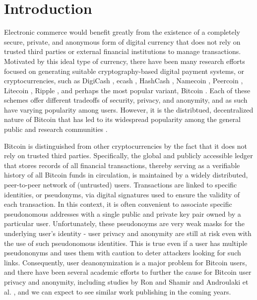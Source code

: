 \section{Introduction}

Electronic commerce would benefit greatly from the existence of a completely secure, private, and anonymous form of digital currency that does not rely on trusted third parties or external financial institutions to manage transactions. Motivated by this ideal type of currency, there have been many research efforts focused on generating suitable cryptography-based digital payment systems, or cryptocurrencies, such as DigiCash \cite{digicash}, ecash \cite{ecash}, HashCash \cite{hashcash}, Namecoin \cite{namecoin}, Peercoin \cite{peercoin}, Litecoin \cite{litecoin}, Ripple \cite{ripple}, and perhaps the most popular variant, Bitcoin \cite{bitcoin}. Each of these schemes offer different tradeoffs of security, privacy, and anonymity, and as such have varying popularity among users. However, it is the distribtued, decentralized nature of Bitcoin that has led to its widespread popularity among the general public and research communities \cite{news articles}. 

Bitcoin is distinguished from other cryptocurrencies by the fact that it does not rely on trusted third parties. Specifically, the global and publicly accessible ledger that stores records of all financial transactions, thereby serving as a verifiable history of all Bitcoin funds in circulation, is maintained by a widely distributed, peer-to-peer network of (untrusted) users. Transactions are linked to specific identities, or pseudonyms, via digital signatures used to ensure the validity of each transaction. In this context, it is often convenient to associate specific pseudonomous addresses with a single public and private key pair owned by a particular user. Unfortunately, these pseudonoyms are very weak masks for the underlying user's identity - user privacy and anonymity are still at risk even with the use of such pseudonomous identities. This is true even if a user has multiple pseudononyms and uses them with caution to deter attackers looking for such links. Consequently, user deanonymization is a major problem for Bitcoin users, and there have been several academic efforts to further the cause for Bitcoin user privacy and anonymity, including studies by Ron and Shamir \cite{Shamir13-bitcoingraph} and Androulaki et al. \cite{Androulaki12-privacy}, and we can expect to see similar work publishing in the coming years.

